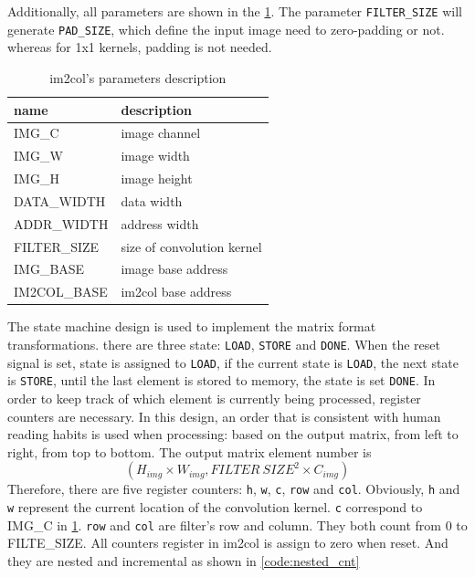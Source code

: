 \documentclass[conference]{IEEEtran}
\begin{document}
Additionally, all parameters are shown in the \ref{tab:im2col_pa}.
The parameter \verb|FILTER_SIZE| will generate \verb|PAD_SIZE|,
which define the input image need to zero-padding or not.
whereas for 1x1 kernels, padding is not needed.

\begin{table}[ht]
    \caption{im2col's parameters description}
    \centering
    \begin{tabular}{|l|l|}
        \hline
        \textbf{name} & \textbf{description}       \\ \hline
        IMG\_C        & image channel              \\ \hline
        IMG\_W        & image width                \\ \hline
        IMG\_H        & image height               \\ \hline
        DATA\_WIDTH   & data width                 \\ \hline
        ADDR\_WIDTH   & address width              \\ \hline
        FILTER\_SIZE  & size of convolution kernel \\ \hline
        IMG\_BASE     & image base address         \\ \hline
        IM2COL\_BASE  & im2col base address        \\ \hline
    \end{tabular}
    \label{tab:im2col_pa}
\end{table}

The state machine design is used to implement the matrix format transformations.
there are three state: \verb|LOAD|, \verb|STORE| and \verb|DONE|.
When the reset signal is set, state is assigned to \verb|LOAD|,
if the current state is \verb|LOAD|, the next state is \verb|STORE|,
until the last element is stored to memory, the state is set \verb|DONE|.
In order to keep track of which element is currently being processed,
register counters are necessary.
In this design, an order that is consistent with human reading habits is used when processing:
based on the output matrix, from left to right, from top to bottom.
The output matrix element number is
\[
  (H_{img} \times W_{img} , FILTER\ SIZE^2 \times C_{img})
\]
Therefore, there are five register counters:
\verb|h|, \verb|w|, \verb|c|, \verb|row| and \verb|col|.
Obviously, \verb|h| and \verb|w| represent the current location of the convolution kernel.
\verb|c| correspond to IMG\_C in \ref{tab:im2col_pa}.
\verb|row| and \verb|col| are filter's row and column.
They both count from 0 to FILTE\_SIZE.
All counters register in im2col is assign to zero when reset.
And they are nested and incremental as shown in \ref{code:nested_cnt}
\end{document}
